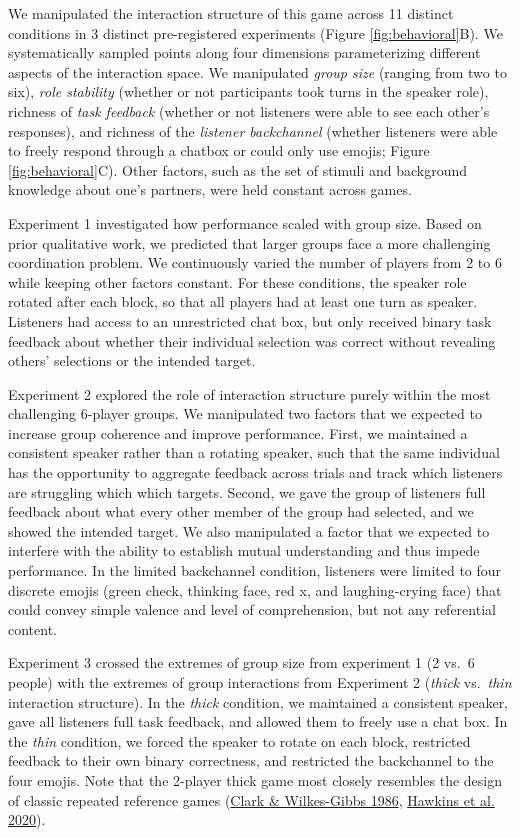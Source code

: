 \documentclass[
  english,
]{article}
\begin{document}
We manipulated the interaction structure of this game across 11 distinct conditions in 3 distinct pre-registered experiments (Figure \ref{fig:behavioral}B).
We systematically sampled points along four dimensions parameterizing different aspects of the interaction space.
We manipulated \emph{group size} (ranging from two to six), \emph{role stability} (whether or not participants took turns in the speaker role), richness of \emph{task feedback} (whether or not listeners were able to see each other's responses), and richness of the \emph{listener backchannel} (whether listeners were able to freely respond through a chatbox or could only use emojis; Figure \ref{fig:behavioral}C).
Other factors, such as the set of stimuli and background knowledge about one's partners, were held constant across games.

Experiment 1 investigated how performance scaled with group size.
Based on prior qualitative work, we predicted that larger groups face a more challenging coordination problem.
We continuously varied the number of players from 2 to 6 while keeping other factors constant.
For these conditions, the speaker role rotated after each block, so that all players had at least one turn as speaker.
Listeners had access to an unrestricted chat box, but only received binary task feedback about whether their individual selection was correct without revealing others' selections or the intended target.

Experiment 2 explored the role of interaction structure purely within the most challenging 6-player groups.
We manipulated two factors that we expected to increase group coherence and improve performance.
First, we maintained a consistent speaker rather than a rotating speaker, such that the same individual has the opportunity to aggregate feedback across trials and track which listeners are struggling which which targets.
Second, we gave the group of listeners full feedback about what every other member of the group had selected, and we showed the intended target.
We also manipulated a factor that we expected to interfere with the ability to establish mutual understanding and thus impede performance.
In the limited backchannel condition, listeners were limited to four discrete emojis (green check, thinking face, red x, and laughing-crying face) that could convey simple valence and level of comprehension, but not any referential content.

Experiment 3 crossed the extremes of group size from experiment 1 (2 vs.~6 people) with the extremes of group interactions from Experiment 2 (\emph{thick} vs.~\emph{thin} interaction structure).
In the \emph{thick} condition, we maintained a consistent speaker, gave all listeners full task feedback, and allowed them to freely use a chat box.
In the \emph{thin} condition, we forced the speaker to rotate on each block, restricted feedback to their own binary correctness, and restricted the backchannel to the four emojis.
Note that the 2-player thick game most closely resembles the design of classic repeated reference games (\protect\hyperlink{ref-clark1986}{Clark \& Wilkes-Gibbs 1986}, \protect\hyperlink{ref-hawkins2020}{Hawkins et al. 2020}).
\end{document}
